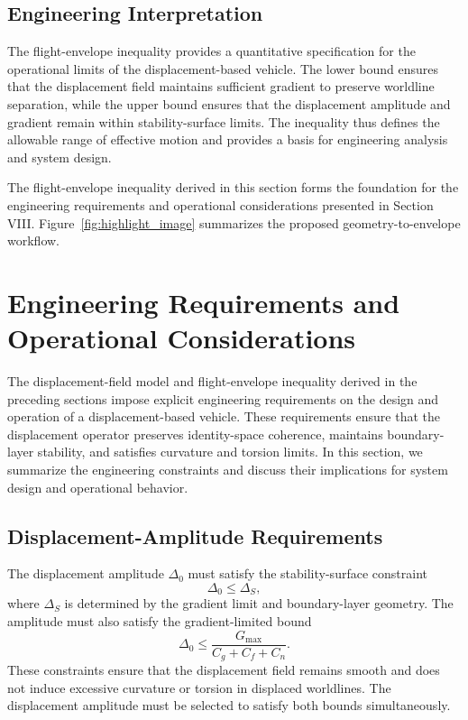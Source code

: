 \documentclass[aip,adv,reprint,floatfix]{revtex4-2}
\begin{document}
\subsection{Engineering Interpretation}

The flight-envelope inequality provides a quantitative specification for the operational limits of the displacement-based vehicle. The lower bound ensures that the displacement field maintains sufficient gradient to preserve worldline separation, while the upper bound ensures that the displacement amplitude and gradient remain within stability-surface limits. The inequality thus defines the allowable range of effective motion and provides a basis for engineering analysis and system design.

The flight-envelope inequality derived in this section forms the foundation for the engineering requirements and operational considerations presented in Section VIII. Figure~\ref{fig:highlight_image} summarizes the proposed geometry-to-envelope workflow.
\section{Engineering Requirements and Operational Considerations}

The displacement-field model and flight-envelope inequality derived in the preceding sections impose explicit engineering requirements on the design and operation of a displacement-based vehicle. These requirements ensure that the displacement operator preserves identity-space coherence, maintains boundary-layer stability, and satisfies curvature and torsion limits. In this section, we summarize the engineering constraints and discuss their implications for system design and operational behavior.

\subsection{Displacement-Amplitude Requirements}

The displacement amplitude $\Delta_0$ must satisfy the stability-surface constraint
\begin{equation}
\Delta_0 \leq \Delta_S,
\end{equation}
where $\Delta_S$ is determined by the gradient limit and boundary-layer geometry. The amplitude must also satisfy the gradient-limited bound
\begin{equation}
\Delta_0 \leq \frac{G_{\max}}{C_g + C_f + C_n}.
\end{equation}
These constraints ensure that the displacement field remains smooth and does not induce excessive curvature or torsion in displaced worldlines. The displacement amplitude must be selected to satisfy both bounds simultaneously.
\end{document}
